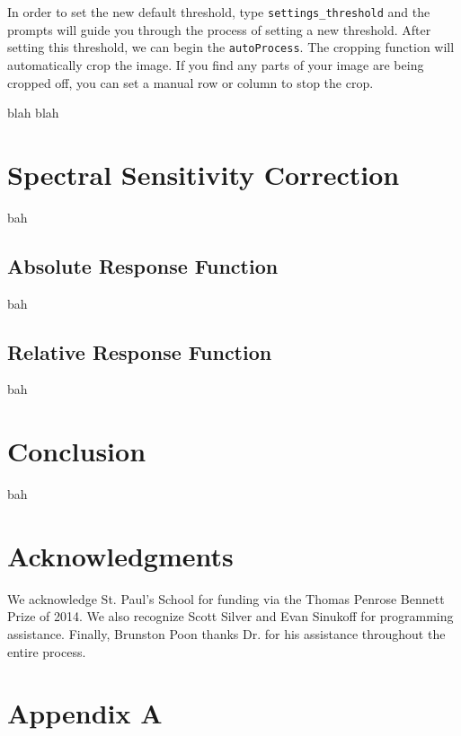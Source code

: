 \documentclass[prb,preprint]{revtex4-1}
\begin{document}
	In order to set the new default threshold, type \verb|settings_threshold| and the prompts will guide you through the process of setting a new threshold. After setting this threshold, we can begin the \verb|autoProcess|. The cropping function will automatically crop the image. If you find any parts of your image are being cropped off, you can set a manual row or column to stop the crop.

	blah blah
\section{Spectral Sensitivity Correction}
	bah
	\subsection{Absolute Response Function}
		bah
	\subsection{Relative Response Function}
		bah
\section{Conclusion}
	bah
	
\section{Acknowledgments}
	We acknowledge St. Paul's School for funding via the Thomas Penrose Bennett Prize of 2014. We also recognize Scott Silver and Evan Sinukoff for programming assistance. Finally, Brunston Poon thanks Dr. \@Mathews for his assistance throughout the entire process.

\section{Appendix A}
\end{document}
